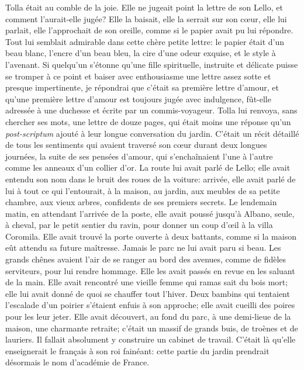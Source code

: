 Tolla était au comble de la joie. Elle ne jugeait point la lettre de son
Lello, et comment l'aurait-elle jugée? Elle la baisait, elle la serrait
sur son cœur, elle lui parlait, elle l'approchait de son oreille, comme
si le papier avait pu lui répondre. Tout lui semblait admirable dans
cette chère petite lettre: le papier était d'un beau blanc, l'encre d'un
beau bleu, la cire d'une odeur exquise, et le style à l'avenant. Si
quelqu'un s'étonne qu'une fille spirituelle, instruite et délicate
puisse se tromper à ce point et baiser avec enthousiasme une lettre
assez sotte et presque impertinente, je répondrai que c'était sa
première lettre d'amour, et qu'une première lettre d'amour est toujours
jugée avec indulgence, fût-elle adressée à une duchesse et écrite par un
commis-voyageur. Tolla lui renvoya, sans chercher ses mots, une lettre
de douze pages, qui était moins une réponse qu'un \emph{post-scriptum}
ajouté à leur longue conversation du jardin. C'était un récit détaillé
de tous les sentiments qui avaient traversé son cœur durant deux longues
journées, la suite de ses pensées d'amour, qui s'enchaînaient l'une à
l'autre comme les anneaux d'un collier d'or. La route lui avait parlé de
Lello; elle avait entendu son nom dans le bruit des roues de la voiture:
arrivée, elle avait parlé de lui à tout ce qui l'entourait, à la maison,
au jardin, aux meubles de sa petite chambre, aux vieux arbres,
confidents de ses premiers secrets. Le lendemain matin, en attendant
l'arrivée de la poste, elle avait poussé jusqu'à Albano, seule, à
cheval, par le petit sentier du ravin, pour donner un coup d'œil à la
villa Coromila. Elle avait trouvé la porte ouverte à deux battants,
comme si la maison eût attendu sa future maîtresse. Jamais le parc ne
lui avait paru si beau. Les grands chênes avaient l'air de se ranger au
bord des avenues, comme de fidèles serviteurs, pour lui rendre hommage.
Elle les avait passés en revue en les saluant de la main. Elle avait
rencontré une vieille femme qui ramas sait du bois mort; elle lui avait
donné de quoi se chauffer tout l'hiver. Deux bambins qui tentaient
l'escalade d'un poirier s'étaient enfuis à son approche; elle avait
cueilli des poires pour les leur jeter. Elle avait découvert, au fond du
parc, à une demi-lieue de la maison, une charmante retraite; c'était un
massif de grands buis, de troènes et de lauriers. Il fallait absolument
y construire un cabinet de travail. C'était là qu'elle enseignerait le
français à son roi fainéant: cette partie du jardin prendrait désormais
le nom d'académie de France.

